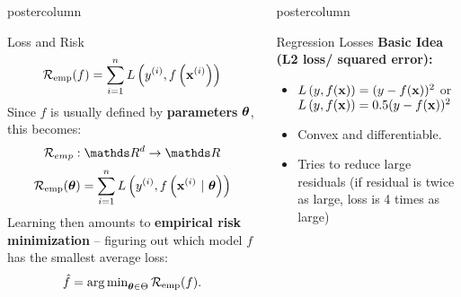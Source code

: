 \documentclass{beamer}
\newlength{\columnheight} %
\begin{document}
\begin{frame}[fragile]{}
\begin{columns}
\begin{column}{.31\textwidth}
\begin{beamercolorbox}[center]{postercolumn}
\begin{minipage}{.98\textwidth}
{\begin{myblock}{Loss and Risk}
            $$\mathcal{R}_{\text{emp}}(f) = \sum\limits_{i=1}^n L\left(y^{(i)}, f\left(\mathbf{x}^{(i)}\right)\right)$$ 
          Since $f$ is usually defined by \textbf{parameters} $\bm{\theta}$, this becomes:
            $$\risk_{emp} : \R^d \to \R$$
            $$\mathcal{R}_{\text{emp}}(\bm{\theta})  =  \sum\limits_{i=1}^n L\left(y^{(i)}, f\left(\mathbf{x}^{(i)} ~|~ \bm{\theta}\right)\right) $$
            \hspace*{1ex}Learning then amounts to \textbf{empirical risk minimization} -- figuring out \hspace*{1ex}which model $f$ has the smallest average loss:$$\hat{f} = \operatorname{arg\,min}_{\bm{\theta} \in \Theta} \mathcal{R}_{\text{emp}}(f).$$
				  \end{myblock}
				}
			\end{minipage}
		\end{beamercolorbox}
	\end{column}
	\begin{column}{.31\textwidth}
		\begin{beamercolorbox}[center]{postercolumn}
			\begin{minipage}{.98\textwidth}
				\parbox[t][\columnheight]{\textwidth}{
          \begin{myblock}{Regression Losses}
			        \textbf{Basic Idea (L2 loss/ squared error):} 
						\begin{itemize}    
						  \setlength{\itemindent}{+.3in}
              \item $L\left(y, f(\mathbf{x})\right) = (y-f(\mathbf{x}))^2$ or $L\left(y, f(\mathbf{x})\right) = 0.5 (y-f(\mathbf{x}))^2$
              \item Convex and differentiable.
              \item Tries to reduce large residuals (if residual is twice as large, loss is 4 times as large)      
            \end{itemize}

            \vspace*{1ex}


\end{myblock}}
\end{minipage}
\end{beamercolorbox}
\end{column}
\end{columns}
\end{frame}
\end{document}
